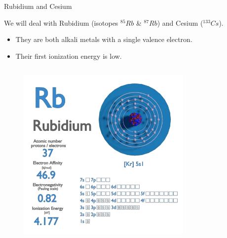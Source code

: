 \begin{frame}{Rubidium and Cesium}

    We will deal with Rubidium (isotopes $^{85}Rb$ \& $^{87}Rb$) and Cesium ($^{133}Cs$).

    \begin{itemize}
        \item They are both alkali metals with a single valence electron.
        \item Their first ionization energy is low.
    \end{itemize}

    \begin{columns}[c, onlytextwidth]

        \begin{column}{0.5\textwidth}

            \begin{figure}
                \centering
                \includegraphics[width=0.8\textwidth]{img/Rubidium.png}
            \end{figure}

        \end{column}

        \begin{column}{0.5\textwidth}


\end{column}
\end{columns}
\end{frame}
